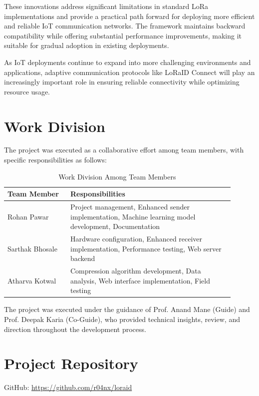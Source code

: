 \documentclass[conference]{IEEEtran}
\begin{document}
These innovations address significant limitations in standard LoRa implementations and provide a practical path forward for deploying more efficient and reliable IoT communication networks. The framework maintains backward compatibility while offering substantial performance improvements, making it suitable for gradual adoption in existing deployments.

As IoT deployments continue to expand into more challenging environments and applications, adaptive communication protocols like LoRaID Connect will play an increasingly important role in ensuring reliable connectivity while optimizing resource usage.

\section{Work Division}
The project was executed as a collaborative effort among team members, with specific responsibilities as follows:

\begin{table}[htbp]
\caption{Work Division Among Team Members}
\label{tab:work_division}
\begin{center}
\begin{tabular}{|p{0.25\linewidth}|p{0.65\linewidth}|}
\hline
\textbf{Team Member} & \textbf{Responsibilities} \\
\hline
Rohan Pawar & Project management, Enhanced sender implementation, Machine learning model development, Documentation \\
\hline
Sarthak Bhosale & Hardware configuration, Enhanced receiver implementation, Performance testing, Web server backend \\
\hline
Atharva Kotwal & Compression algorithm development, Data analysis, Web interface implementation, Field testing \\
\hline
\end{tabular}
\end{center}
\end{table}

The project was executed under the guidance of Prof. Anand Mane (Guide) and Prof. Deepak Karia (Co-Guide), who provided technical insights, review, and direction throughout the development process.

\section*{Project Repository}
GitHub: \url{https://github.com/r04nx/loraid}
\end{document}
